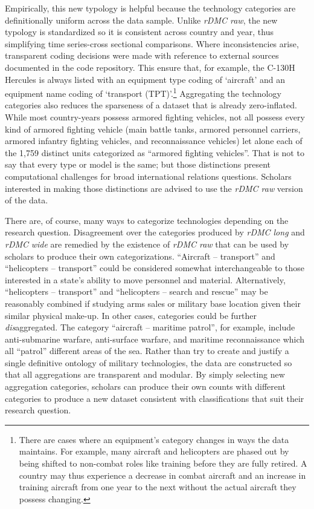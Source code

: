 \documentclass[
]{article}
\begin{document}
Empirically, this new typology is helpful because the technology categories are definitionally uniform across the data sample. Unlike \emph{rDMC raw}, the new typology is standardized so it is consistent across country and year, thus simplifying time series-cross sectional comparisons. Where inconsistencies arise, transparent coding decisions were made with reference to external sources documented in the code repository. This ensure that, for example, the C-130H Hercules is always listed with an equipment type coding of `aircraft' and an equipment name coding of `transport (TPT)'.\footnote{There are cases where an equipment's category changes in ways the data maintains. For example, many aircraft and helicopters are phased out by being shifted to non-combat roles like training before they are fully retired. A country may thus experience a decrease in combat aircraft and an increase in training aircraft from one year to the next without the actual aircraft they possess changing.} Aggregating the technology categories also reduces the sparseness of a dataset that is already zero-inflated. While most country-years possess armored fighting vehicles, not all possess every kind of armored fighting vehicle (main battle tanks, armored personnel carriers, armored infantry fighting vehicles, and reconnaissance vehicles) let alone each of the 1,759 distinct units categorized as ``armored fighting vehicles''. That is not to say that every type or model is the same; but those distinctions present computational challenges for broad international relations questions. Scholars interested in making those distinctions are advised to use the \emph{rDMC raw} version of the data.

There are, of course, many ways to categorize technologies depending on the research question. Disagreement over the categories produced by \emph{rDMC long} and \emph{rDMC} \emph{wide} are remedied by the existence of \emph{rDMC raw} that can be used by scholars to produce their own categorizations. ``Aircraft -- transport'' and ``helicopters -- transport'' could be considered somewhat interchangeable to those interested in a state's ability to move personnel and material. Alternatively, ``helicopters -- transport'' and ``helicopters -- search and rescue'' may be reasonably combined if studying arms sales or military base location given their similar physical make-up. In other cases, categories could be further \emph{dis}aggregated. The category ``aircraft -- maritime patrol'', for example, include anti-submarine warfare, anti-surface warfare, and maritime reconnaissance which all ``patrol'' different areas of the sea. Rather than try to create and justify a single definitive ontology of military technologies, the data are constructed so that all aggregations are transparent and modular. By simply selecting new aggregation categories, scholars can produce their own counts with different categories to produce a new dataset consistent with classifications that suit their research question.
\end{document}
